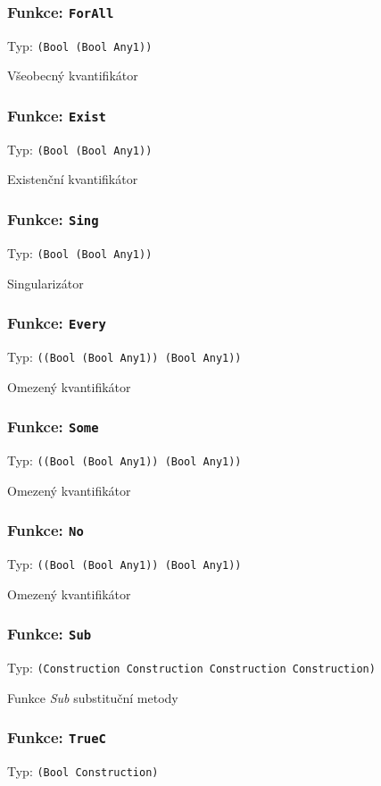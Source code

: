 \subsubsection*{Funkce: \lstinline|ForAll|}
Typ: \lstinline|(Bool (Bool Any1))|

Všeobecný kvantifikátor

\subsubsection*{Funkce: \lstinline|Exist|}
Typ: \lstinline|(Bool (Bool Any1))|

Existenční kvantifikátor

\subsubsection*{Funkce: \lstinline|Sing|}
Typ: \lstinline|(Bool (Bool Any1))|

Singularizátor

\subsubsection*{Funkce: \lstinline|Every|}
Typ: \lstinline|((Bool (Bool Any1)) (Bool Any1))|

Omezený kvantifikátor

\subsubsection*{Funkce: \lstinline|Some|}
Typ: \lstinline|((Bool (Bool Any1)) (Bool Any1))|

Omezený kvantifikátor

\subsubsection*{Funkce: \lstinline|No|}
Typ: \lstinline|((Bool (Bool Any1)) (Bool Any1))|

Omezený kvantifikátor

\subsubsection*{Funkce: \lstinline|Sub|}
Typ: \lstinline|(Construction Construction Construction Construction)|

Funkce \textit{Sub} substituční metody

\subsubsection*{Funkce: \lstinline|TrueC|}
Typ: \lstinline|(Bool Construction)|

